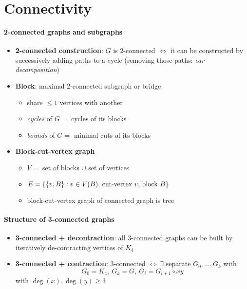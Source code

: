 \section{Connectivity}

\paragraph{2-connected graphs and subgraphs}
\begin{itemize}
  \item \textbf{2-connected construction}: $ G $ is $ 2 $-connected $ \Leftrightarrow $ it can be constructed by successively adding paths to a cycle (removing those paths: \emph{ear-decomposition})
  \item \textbf{Block}: maximal $ 2 $-connected subgraph or bridge
  \begin{itemize}
    \item share $ \leq 1 $ vertices with another
    \item \emph{cycles} of $ G = $ cycles of its blocks
    \item \emph{bounds} of $ G = $ minimal cuts of its blocks
  \end{itemize} 
  \item \textbf{Block-cut-vertex graph}
  \begin{itemize}
    \item $ V = $ set of blocks $ \cup $ set of vertices
    \item $ E = \{ \{ v,B \} : v \in V(B) \text{, cut-vertex $ v $, block $ B $} \} $ 
    \item block-cut-vertex graph of connected graph is tree
  \end{itemize}
\end{itemize}

\paragraph{Structure of 3-connected graphs}
\begin{itemize}
  \item \textbf{3-connected + decontraction}: all $ 3 $-connected graphs can be built by iteratively de-contracting vertices of $ K_4 $
  \item \textbf{3-connected + contraction}: $ 3 $-connected $ \Leftrightarrow \ \exists $ separate $ G_0, \dots, G_k $ with
  \begin{equation*}
    G_0 = K_4, \ G_k = G, \ G_i = G_{i+1} \circ xy
  \end{equation*}
  with $ \deg(x), \deg(y) \geq 3 $
\end{itemize}

